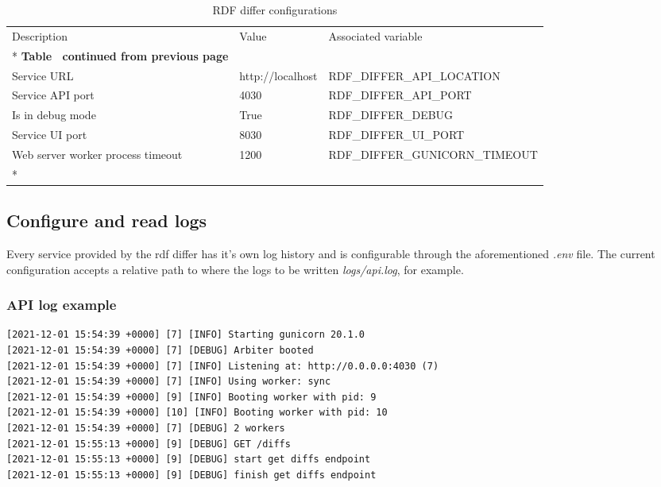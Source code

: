\begin{longtable}[c]{@{}p{3.5cm}p{3.5cm}l@{}}
	\toprule
	Description                       & Value            & Associated variable            \\* \midrule
	\endfirsthead
	\multicolumn{3}{c}%
	{{\bfseries Table \thetable\ continued from previous page}}                           \\
	\endhead
	\bottomrule
	\endfoot
	\endlastfoot
	Service URL                       & http://localhost & RDF\_DIFFER\_API\_LOCATION     \\
	Service API port                  & 4030             & RDF\_DIFFER\_API\_PORT         \\
	Is in debug mode                  & True             & RDF\_DIFFER\_DEBUG             \\
	Service UI port                   & 8030             & RDF\_DIFFER\_UI\_PORT          \\
	Web server worker process timeout & 1200             & RDF\_DIFFER\_GUNICORN\_TIMEOUT \\* \bottomrule
	\caption{RDF differ configurations}
	\label{tab:my-table1}                                                                 \\
\end{longtable}

\subsection{Configure and read logs}
Every service provided by the rdf differ has it's own log history and is configurable through the aforementioned \textit{.env} file. The current configuration accepts a relative path to where the logs to be written \textit{logs/api.log}, for example.

\subsubsection{API log example}
\begin{lstlisting}
[2021-12-01 15:54:39 +0000] [7] [INFO] Starting gunicorn 20.1.0
[2021-12-01 15:54:39 +0000] [7] [DEBUG] Arbiter booted
[2021-12-01 15:54:39 +0000] [7] [INFO] Listening at: http://0.0.0.0:4030 (7)
[2021-12-01 15:54:39 +0000] [7] [INFO] Using worker: sync
[2021-12-01 15:54:39 +0000] [9] [INFO] Booting worker with pid: 9
[2021-12-01 15:54:39 +0000] [10] [INFO] Booting worker with pid: 10
[2021-12-01 15:54:39 +0000] [7] [DEBUG] 2 workers
[2021-12-01 15:55:13 +0000] [9] [DEBUG] GET /diffs
[2021-12-01 15:55:13 +0000] [9] [DEBUG] start get diffs endpoint
[2021-12-01 15:55:13 +0000] [9] [DEBUG] finish get diffs endpoint
\end{lstlisting}

